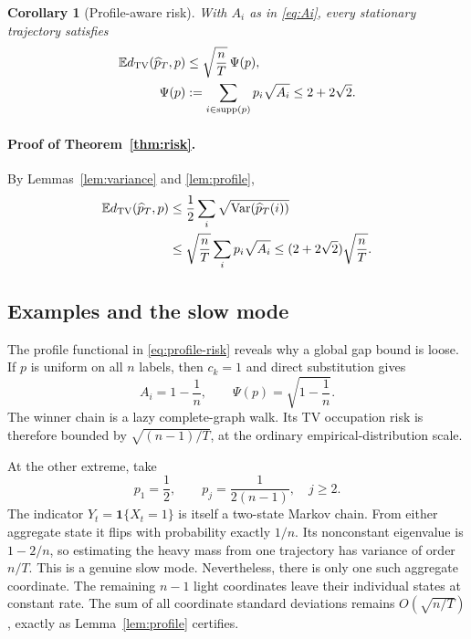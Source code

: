 \documentclass[twoside]{article}
\newtheorem{corollary}[theorem]{Corollary}
\newcommand{\E}{\mathbb E}
\newcommand{\one}{\mathbf 1}
\newcommand{\TV}{d_{\rm TV}}
\newcommand{\supp}{\operatorname{supp}}
\begin{document}
\begin{corollary}[Profile-aware risk]
\label{cor:profile-risk}
With $A_i$ as in \eqref{eq:Ai}, every stationary trajectory satisfies
\begin{align}
 \E\TV(\widehat p_T,p)
 &\le\sqrt{\frac nT}\,\Psi(p),\notag\\
 \Psi(p)&:=\sum_{i\in\supp(p)}p_i\sqrt{A_i}
 \le2+2\sqrt2.
 \label{eq:profile-risk}
\end{align}
\end{corollary}

\paragraph{Proof of Theorem~\ref{thm:risk}.}
By Lemmas~\ref{lem:variance} and \ref{lem:profile},
\begin{align*}
 \E\TV(\widehat p_T,p)
 &\le\frac12\sum_i
 \sqrt{\operatorname{Var}(\widehat p_T(i))}\\
 &\le\sqrt{\frac nT}\sum_i p_i\sqrt{A_i}
 \le(2+2\sqrt2)\sqrt{\frac nT}.
\end{align*}

\subsection{Examples and the slow mode}
\label{sec:examples}

The profile functional in \eqref{eq:profile-risk} reveals why a global gap bound is loose. If $p$ is uniform on all $n$ labels, then $c_k=1$ and direct substitution gives \[ A_i=1-\frac1n,\qquad \Psi(p)=\sqrt{1-\frac1n}. \] The winner chain is a lazy complete-graph walk. Its TV occupation risk is therefore bounded by $\sqrt{(n-1)/T}$, at the ordinary empirical-distribution scale.

At the other extreme, take
\begin{equation}
 p_1=\frac12,\qquad p_j=\frac1{2(n-1)},\quad j\ge2.
 \label{eq:half-heavy}
\end{equation}
The indicator $Y_t=\one\{X_t=1\}$ is itself a two-state Markov chain. From either aggregate state it flips with probability exactly $1/n$. Its nonconstant eigenvalue is $1-2/n$, so estimating the heavy mass from one trajectory has variance of order $n/T$. This is a genuine slow mode. Nevertheless, there is only one such aggregate coordinate. The remaining $n-1$ light coordinates leave their individual states at constant rate. The sum of all coordinate standard deviations remains $O(\sqrt{n/T})$, exactly as Lemma~\ref{lem:profile} certifies.
\end{document}
